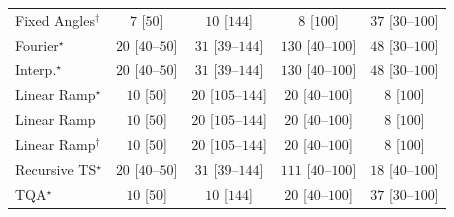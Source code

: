 \begin{tabular}{l|cccc|}
Fixed Angles$^\dagger$ & {\cellcolor[HTML]{F7FCF5}} \color[HTML]{000000} $7$ [$50$] & {\cellcolor[HTML]{F7FCF5}} \color[HTML]{000000} $10$ [$144$] & {\cellcolor[HTML]{F7FCF5}} \color[HTML]{000000} $8$ [$100$] & {\cellcolor[HTML]{F2FAEF}} \color[HTML]{000000} $37$ [$30$--$100$] \\
Fourier$^\star$ & {\cellcolor[HTML]{F5FBF2}} \color[HTML]{000000} $20$ [$40$--$50$] & {\cellcolor[HTML]{F3FAF0}} \color[HTML]{000000} $31$ [$39$--$144$] & {\cellcolor[HTML]{DFF3DA}} \color[HTML]{000000} $130$ [$40$--$100$] & {\cellcolor[HTML]{F0F9ED}} \color[HTML]{000000} $48$ [$30$--$100$] \\
Interp.$^\star$ & {\cellcolor[HTML]{F5FBF2}} \color[HTML]{000000} $20$ [$40$--$50$] & {\cellcolor[HTML]{F3FAF0}} \color[HTML]{000000} $31$ [$39$--$144$] & {\cellcolor[HTML]{DFF3DA}} \color[HTML]{000000} $130$ [$40$--$100$] & {\cellcolor[HTML]{F0F9ED}} \color[HTML]{000000} $48$ [$30$--$100$] \\
Linear Ramp$^\star$ & {\cellcolor[HTML]{F7FCF5}} \color[HTML]{000000} $10$ [$50$] & {\cellcolor[HTML]{F5FBF2}} \color[HTML]{000000} $20$ [$105$--$144$] & {\cellcolor[HTML]{F5FBF2}} \color[HTML]{000000} $20$ [$40$--$100$] & {\cellcolor[HTML]{F7FCF5}} \color[HTML]{000000} $8$ [$100$] \\
Linear Ramp & {\cellcolor[HTML]{F7FCF5}} \color[HTML]{000000} $10$ [$50$] & {\cellcolor[HTML]{F5FBF2}} \color[HTML]{000000} $20$ [$105$--$144$] & {\cellcolor[HTML]{F5FBF2}} \color[HTML]{000000} $20$ [$40$--$100$] & {\cellcolor[HTML]{F7FCF5}} \color[HTML]{000000} $8$ [$100$] \\
Linear Ramp$^\dagger$ & {\cellcolor[HTML]{F7FCF5}} \color[HTML]{000000} $10$ [$50$] & {\cellcolor[HTML]{F5FBF2}} \color[HTML]{000000} $20$ [$105$--$144$] & {\cellcolor[HTML]{F5FBF2}} \color[HTML]{000000} $20$ [$40$--$100$] & {\cellcolor[HTML]{F7FCF5}} \color[HTML]{000000} $8$ [$100$] \\
Recursive TS$^\star$ & {\cellcolor[HTML]{F5FBF2}} \color[HTML]{000000} $20$ [$40$--$50$] & {\cellcolor[HTML]{F3FAF0}} \color[HTML]{000000} $31$ [$39$--$144$] & {\cellcolor[HTML]{E5F5E0}} \color[HTML]{000000} $111$ [$40$--$100$] & {\cellcolor[HTML]{F5FBF3}} \color[HTML]{000000} $18$ [$40$--$100$] \\
TQA$^\star$ & {\cellcolor[HTML]{F7FCF5}} \color[HTML]{000000} $10$ [$50$] & {\cellcolor[HTML]{F7FCF5}} \color[HTML]{000000} $10$ [$144$] & {\cellcolor[HTML]{F5FBF2}} \color[HTML]{000000} $20$ [$40$--$100$] & {\cellcolor[HTML]{F2FAEF}} \color[HTML]{000000} $37$ [$30$--$100$] \\

\end{tabular}
